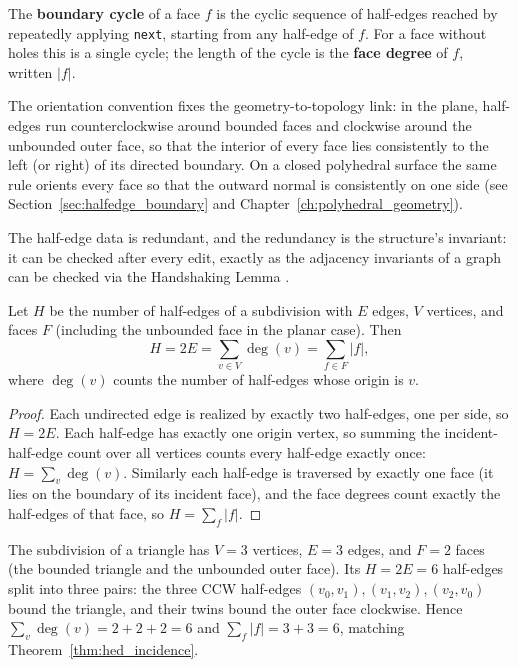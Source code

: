 \begin{definition}\label{def:hed_boundary_cycle}
The \textbf{boundary cycle} of a face $f$ is the cyclic sequence of
half-edges reached by repeatedly applying \texttt{next}, starting from any
half-edge of $f$. For a face without holes this is a single cycle; the
length of the cycle is the \textbf{face degree} of $f$, written $|f|$.
\end{definition}

The orientation convention fixes the geometry-to-topology link: in the
plane, half-edges run counterclockwise around bounded faces and clockwise
around the unbounded outer face, so that the interior of every face lies
consistently to the left (or right) of its directed boundary. On a closed
polyhedral surface the same rule orients every face so that the outward
normal is consistently on one side (see Section~\ref{sec:halfedge_boundary}
and Chapter~\ref{ch:polyhedral_geometry}).

The half-edge data is redundant, and the redundancy is the structure's
invariant: it can be checked after every edit, exactly as the adjacency
invariants of a graph can be checked via the Handshaking Lemma
\cite{diestel2017}.

\begin{theorem}\label{thm:hed_incidence}
Let $H$ be the number of half-edges of a subdivision with $E$ edges,
$V$ vertices, and faces $F$ (including the unbounded face in the planar
case). Then
\[
H = 2E = \sum_{v \in V} \deg(v) = \sum_{f \in F} |f| ,
\]
where $\deg(v)$ counts the number of half-edges whose origin is $v$.
\end{theorem}

\begin{proof}
Each undirected edge is realized by exactly two half-edges, one per side,
so $H = 2E$. Each half-edge has exactly one origin vertex, so summing the
incident-half-edge count over all vertices counts every half-edge exactly
once: $H = \sum_v \deg(v)$. Similarly each half-edge is traversed by exactly
one face (it lies on the boundary of its incident face), and the face
degrees count exactly the half-edges of that face, so $H = \sum_f |f|$.
\end{proof}

\begin{example}\label{ex:hed_triangle}
The subdivision of a triangle has $V = 3$ vertices, $E = 3$ edges, and
$F = 2$ faces (the bounded triangle and the unbounded outer face). Its
$H = 2E = 6$ half-edges split into three pairs: the three CCW half-edges
$(v_0, v_1), (v_1, v_2), (v_2, v_0)$ bound the triangle, and their twins
bound the outer face clockwise. Hence $\sum_v \deg(v) = 2 + 2 + 2 = 6$ and
$\sum_f |f| = 3 + 3 = 6$, matching Theorem~\ref{thm:hed_incidence}.
\end{example}


